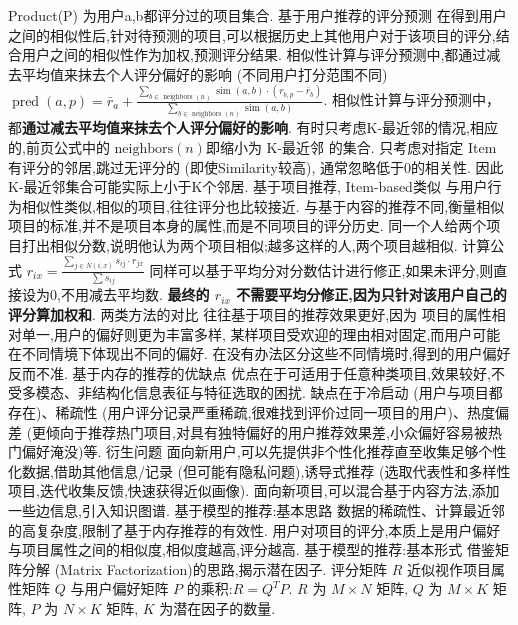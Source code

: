\documentclass[10pt, utf8]{ctexart}
\begin{document}
\begin{multicols}{4}
    Product(P) 为用户a,b都评分过的项目集合.
    {\color{red}基于用户推荐的评分预测}
    在得到用户之间的相似性后,针对待预测的项目,可以根据历史上其他用户对于该项目的评分,结合用户之间的相似性作为加权,预测评分结果.
    相似性计算与评分预测中,都通过减去平均值来抹去个人评分偏好的影响 (不同用户打分范围不同)
    {\tiny$\operatorname{pred}(a, p)=\bar{r}_{a}+\frac{\sum_{b \in \text { neighbors }(n)} \operatorname{sim}(a, b) \cdot\left(r_{b, p}-\bar{r}_{b}\right)}{\sum_{b \in  \text { neighbors }(n)} \operatorname{sim}(a, b)}$}.
    相似性计算与评分预测中，都\textbf{通过减去平均值来抹去个人评分偏好的影响}.
    有时只考虑K-最近邻的情况,相应的,前页公式中的 $\text{neighbors}(n)$即缩小为 K-最近邻 的集合.
    只考虑对指定 Item 有评分的邻居,跳过无评分的 (即使Similarity较高),
    通常忽略低于0的相关性.
    因此 K-最近邻集合可能实际上小于K个邻居.
    {\color{red}基于项目推荐, Item-based类似}
    与用户行为相似性类似,相似的项目,往往评分也比较接近.
    与基于内容的推荐不同,衡量相似项目的标准,并不是项目本身的属性,而是不同项目的评分历史.
    同一个人给两个项目打出相似分数,说明他认为两个项目相似;越多这样的人,两个项目越相似.
    计算公式
    {\tiny$ r_{ix} = \frac {\sum_{j\in N(i,x)}s_{ij}\cdot r_{jx}}{\sum  s_{ij}} $}
    同样可以基于平均分对分数估计进行修正,如果未评分,则直接设为0,不用减去平均数.
    \textbf{最终的 $r_{ix}$ 不需要平均分修正,因为只针对该用户自己的评分算加权和}.
    {\color{blue}两类方法的对比}
    往往基于项目的推荐效果更好,因为
    项目的属性相对单一,用户的偏好则更为丰富多样,
    某样项目受欢迎的理由相对固定,而用户可能在不同情境下体现出不同的偏好.
    在没有办法区分这些不同情境时,得到的用户偏好反而不准.
    {\color{blue}基于内存的推荐的优缺点}
    优点在于可适用于任意种类项目,效果较好,不受多模态、非结构化信息表征与特征选取的困扰.
    缺点在于冷启动 (用户与项目都存在)、稀疏性 (用户评分记录严重稀疏,很难找到评价过同一项目的用户)、热度偏差 (更倾向于推荐热门项目,对具有独特偏好的用户推荐效果差,小众偏好容易被热门偏好淹没)等.
    {\color{blue}衍生问题}
    面向新用户,可以先提供非个性化推荐直至收集足够个性化数据,借助其他信息/记录 (但可能有隐私问题),诱导式推荐 (选取代表性和多样性项目,迭代收集反馈,快速获得近似画像).
    面向新项目,可以混合基于内容方法,添加一些边信息,引入知识图谱.
    {\color{blue}基于模型的推荐:基本思路}
    数据的稀疏性、计算最近邻的高复杂度,限制了基于内存推荐的有效性.
    用户对项目的评分,本质上是用户偏好与项目属性之间的相似度,相似度越高,评分越高.
    {\color{blue}基于模型的推荐:基本形式}
    借鉴矩阵分解 (Matrix Factorization)的思路,揭示潜在因子.
    评分矩阵 $R$ 近似视作项目属性矩阵 $Q$ 与用户偏好矩阵 $P$ 的乘积:$R = Q^T P$. $R$ 为 $M \times N$ 矩阵, $Q$ 为 $M \times K$ 矩阵, $P$ 为 $N \times K$ 矩阵, $K$ 为潜在因子的数量.

\end{multicols}
\end{document}
